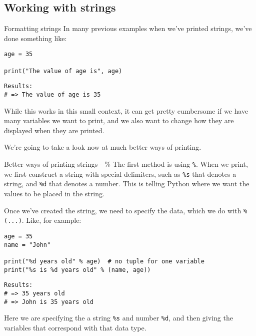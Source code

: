 \documentclass[10pt]{beamer}
\begin{document}
\subsection{Working with strings}
\label{sec:org8e6ac0a}

\begin{frame}[label={sec:org6ee7f76},fragile]{Formatting strings}
 In many previous examples when we've printed strings, we've done something like:

\begin{verbatim}
age = 35

print("The value of age is", age)
\end{verbatim}

\begin{verbatim}
Results: 
# => The value of age is 35
\end{verbatim}


While this works in this small context, it can get pretty cumbersome if we have many
variables we want to print, and we also want to change how they are displayed when
they are printed.

We're going to take a look now at much better ways of printing.
\end{frame}

\begin{frame}[label={sec:orgdcb6b85},fragile]{Better ways of printing strings - \%}
 The first method is using \texttt{\%}. When we print, we first construct a string with special
delimiters, such as \texttt{\%s} that denotes a string, and \texttt{\%d} that denotes a number. This is
telling Python where we want the values to be placed in the string.

Once we've created the string, we need to specify the data, which we do with \texttt{\%
(...)}. Like, for example:

\begin{verbatim}
age = 35
name = "John"

print("%d years old" % age)  # no tuple for one variable
print("%s is %d years old" % (name, age)) 
\end{verbatim}

\begin{verbatim}
Results: 
# => 35 years old
# => John is 35 years old
\end{verbatim}


Here we are specifying the a string \texttt{\%s} and number \texttt{\%d}, and then giving the variables
that correspond with that data type.
\end{frame}
\end{document}
